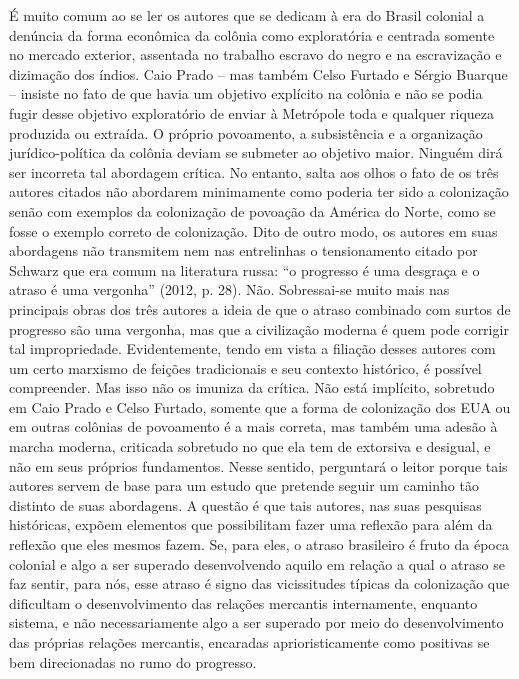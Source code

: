 É muito comum ao se ler os autores que se dedicam à era do Brasil
colonial a denúncia da forma econômica da colônia como exploratória e
centrada somente no mercado exterior, assentada no trabalho escravo do
negro e na escravização e dizimação dos índios. Caio Prado -- mas também
Celso Furtado e Sérgio Buarque -- insiste no fato de que havia um
objetivo explícito na colônia e não se podia fugir desse objetivo
exploratório de enviar à Metrópole toda e qualquer riqueza produzida ou
extraída. O próprio povoamento, a subsistência e a organização
jurídico-política da colônia deviam se submeter ao objetivo maior.
Ninguém dirá ser incorreta tal abordagem crítica. No entanto, salta aos
olhos o fato de os três autores citados não abordarem minimamente como
poderia ter sido a colonização senão com exemplos da colonização de
povoação da América do Norte, como se fosse o exemplo correto de
colonização. Dito de outro modo, os autores em suas abordagens não
transmitem nem nas entrelinhas o tensionamento citado por Schwarz que
era comum na literatura russa: ``o progresso é uma desgraça e o atraso é
uma vergonha'' (2012, p. 28). Não. Sobressai-se muito mais nas
principais obras dos três autores a ideia de que o atraso combinado com
surtos de progresso são uma vergonha, mas que a civilização moderna é
quem pode corrigir tal impropriedade. Evidentemente, tendo em vista a
filiação desses autores com um certo marxismo de feições tradicionais e
seu contexto histórico, é possível compreender. Mas isso não os imuniza
da crítica. Não está implícito, sobretudo em Caio Prado e Celso Furtado,
somente que a forma de colonização dos EUA ou em outras colônias de
povoamento é a mais correta, mas também uma adesão à marcha moderna,
criticada sobretudo no que ela tem de extorsiva e desigual, e não em
seus próprios fundamentos. Nesse sentido, perguntará o leitor porque
tais autores servem de base para um estudo que pretende seguir um
caminho tão distinto de suas abordagens. A questão é que tais autores,
nas suas pesquisas históricas, expõem elementos que possibilitam fazer
uma reflexão para além da reflexão que eles mesmos fazem. Se, para eles,
o atraso brasileiro é fruto da época colonial e algo a ser superado
desenvolvendo aquilo em relação a qual o atraso se faz sentir, para nós,
esse atraso é signo das vicissitudes típicas da colonização que
dificultam o desenvolvimento das relações mercantis internamente,
enquanto sistema, e não necessariamente algo a ser superado por meio do
desenvolvimento das próprias relações mercantis, encaradas
aprioristicamente como positivas se bem direcionadas no rumo do
progresso.

